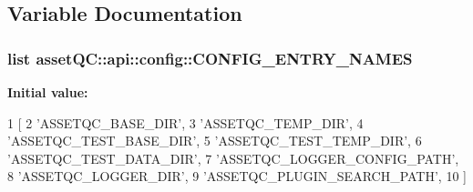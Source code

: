 \subsection{\-Variable \-Documentation}
\hypertarget{namespaceassetQC_1_1api_1_1config_a929757ed802120d5a3e85a78b8ac7b65}{
\subsubsection[{\-C\-O\-N\-F\-I\-G\-\_\-\-E\-N\-T\-R\-Y\-\_\-\-N\-A\-M\-E\-S}]{\setlength{\rightskip}{0pt plus 5cm}list {\bf asset\-Q\-C\-::api\-::config\-::\-C\-O\-N\-F\-I\-G\-\_\-\-E\-N\-T\-R\-Y\-\_\-\-N\-A\-M\-E\-S}}}\label{de/d2b/namespaceassetQC_1_1api_1_1config_a929757ed802120d5a3e85a78b8ac7b65}
{\bfseries \-Initial value\-:}
\begin{DoxyCode}
1 [
2     'ASSETQC_BASE_DIR',
3     'ASSETQC_TEMP_DIR',
4     'ASSETQC_TEST_BASE_DIR',
5     'ASSETQC_TEST_TEMP_DIR',
6     'ASSETQC_TEST_DATA_DIR',
7     'ASSETQC_LOGGER_CONFIG_PATH',
8     'ASSETQC_LOGGER_DIR',
9     'ASSETQC_PLUGIN_SEARCH_PATH',
10 ]
\end{DoxyCode}
